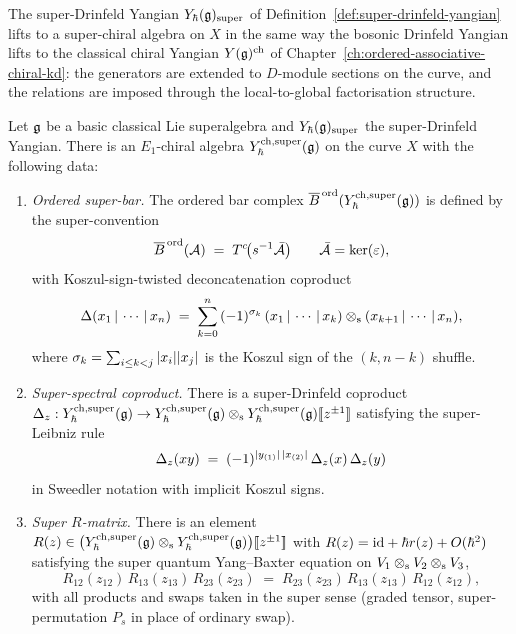 The super-Drinfeld Yangian $Y_{\hbar}(\mathfrak{g})_{\mathrm{super}}$ of
Definition~\ref{def:super-drinfeld-yangian} lifts to a
super-chiral algebra on $X$ in the same way the bosonic Drinfeld Yangian
lifts to the classical chiral Yangian $Y(\mathfrak{g})^{\mathrm{ch}}$ of
Chapter~\ref{ch:ordered-associative-chiral-kd}: the generators are
extended to $D$-module sections on the curve, and the relations are
imposed through the local-to-global factorisation structure.

\begin{theorem}
\label{thm:super-yangian-e1-chiral-structure}
Let $\mathfrak{g}$ be a basic classical Lie superalgebra and $Y_{\hbar}(\mathfrak{g})_{\mathrm{super}}$
the super-Drinfeld Yangian. There is an $E_1$-chiral algebra
$Y^{\mathrm{ch},\mathrm{super}}_{\hbar}(\mathfrak{g})$ on the curve $X$ with the following data:
\begin{enumerate}[label=\textup{(\roman*)}]
\item \emph{Ordered super-bar.} The ordered bar complex $\overline{B}^{\,\mathrm{ord}}(Y^{\mathrm{ch},\mathrm{super}}_{\hbar}(\mathfrak{g}))$ is
 defined by the super-convention
 \[
 \overline{B}^{\,\mathrm{ord}}(\mathcal{A}) \;=\; T^c\!\bigl(s^{-1}\bar{\mathcal{A}}\bigr)\qquad
 \bar{\mathcal{A}}=\ker(\varepsilon),
 \]
 with Koszul-sign-twisted deconcatenation coproduct
 \begin{equation}
 \label{eq:super-deconcat}
 \Delta(x_1\,|\,\cdots\,|\,x_n)
 \;=\; \sum_{k=0}^{n}\,
 (-1)^{\sigma_k}\,
 (x_1\,|\,\cdots\,|\,x_k)\mathbin{\otimes_{\mathrm{s}}}(x_{k+1}\,|\,\cdots\,|\,x_n),
 \end{equation}
 where $\sigma_k = \sum_{i\le k < j}|x_i||x_j|$ is the
 Koszul sign of the $(k, n-k)$ shuffle.
\item \emph{Super-spectral coproduct.} There is a super-Drinfeld
 coproduct $\Delta_z: Y^{\mathrm{ch},\mathrm{super}}_{\hbar}(\mathfrak{g})\to
 Y^{\mathrm{ch},\mathrm{super}}_{\hbar}(\mathfrak{g})\mathbin{\otimes_{\mathrm{s}}}Y^{\mathrm{ch},\mathrm{super}}_{\hbar}(\mathfrak{g})[\![z^{\pm 1}]\!]$ satisfying
 the super-Leibniz rule
 \begin{equation}
 \label{eq:super-leibniz}
 \Delta_z(xy)
 \;=\; (-1)^{|y_{(1)}|\,|x_{(2)}|}\,
 \Delta_z(x)\,\Delta_z(y)
 \end{equation}
 in Sweedler notation with implicit Koszul signs.
\item \emph{Super $R$-matrix.} There is an element $R(z)\in
 \bigl(Y^{\mathrm{ch},\mathrm{super}}_{\hbar}(\mathfrak{g})\mathbin{\otimes_{\mathrm{s}}}Y^{\mathrm{ch},\mathrm{super}}_{\hbar}(\mathfrak{g})\bigr)[\![z^{\pm 1}]\!]$
 with $R(z) = \mathrm{id} + \hbar r(z) + O(\hbar^2)$ satisfying the super
 quantum Yang--Baxter equation on $V_1\mathbin{\otimes_{\mathrm{s}}} V_2\mathbin{\otimes_{\mathrm{s}}} V_3$,
 \begin{equation}
 \label{eq:super-qybe}
 R_{12}(z_{12})\,R_{13}(z_{13})\,R_{23}(z_{23})
 \;=\; R_{23}(z_{23})\,R_{13}(z_{13})\,R_{12}(z_{12}),
 \end{equation}
 with all products and swaps taken in the super sense (graded tensor,
 super-permutation $P_s$ in place of ordinary swap).
\end{enumerate}
\end{theorem}

